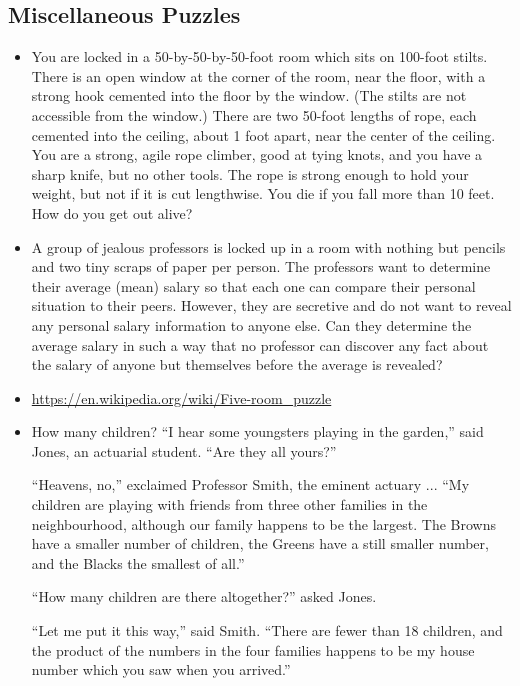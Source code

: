 \documentclass[12pt]{article}
\begin{document}
\subsection{Miscellaneous Puzzles}
\begin{itemize}
  \item You are locked in a 50-by-50-by-50-foot room which sits on 100-foot stilts. There is an open window at the corner of the room, near the floor, with a strong hook cemented into the floor by the window. (The stilts are not accessible from the window.) There are two 50-foot lengths of rope, each cemented into the ceiling, about 1 foot apart, near the center of the ceiling. You are a strong, agile rope climber, good at tying knots, and you have a sharp knife, but no other tools. The rope is strong enough to hold your weight, but not if it is cut lengthwise. You die if you fall more than 10 feet. How do you get out alive?

  \item A group of jealous professors is locked up in a room with nothing but pencils and two tiny scraps of paper per person. The professors want to determine their average (mean) salary so that each one can compare their personal situation to their peers. However, they are secretive and do not want to reveal any personal salary information to anyone else. Can they determine the average salary in such a way that no professor can discover any fact about the salary of anyone but themselves before the average is revealed?

  \item \url{https://en.wikipedia.org/wiki/Five-room_puzzle}

  \item How many children?
``I hear some youngsters playing in the garden,'' said Jones, an actuarial student. ``Are they all yours?''

``Heavens, no,'' exclaimed Professor Smith, the eminent actuary ... ``My children are playing with friends from three other families in the neighbourhood, although our family happens to be the largest. The Browns have a smaller number of children, the Greens have a still smaller number, and the Blacks the smallest of all.''

``How many children are there altogether?'' asked Jones.

``Let me put it this way,'' said Smith. ``There are fewer than 18 children, and the product of the numbers in the four families happens to be my house number which you saw when you arrived.''


\end{itemize}
\end{document}
